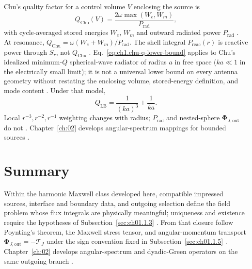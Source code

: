 Chu's quality factor for a control volume $V$ enclosing the source is
\begin{equation}
\label{eq:ch1.chu-q-definition}
Q_{\mathrm{Chu}}(V)=\frac{2\omega\max(W_e,W_m)}{P_{\mathrm{rad}}},
\end{equation}
with cycle-averaged stored energies $W_e$, $W_m$ and outward radiated power $P_{\mathrm{rad}}$ \cite{chu1948}. At resonance, $Q_{\mathrm{Chu}}=\omega(W_e+W_m)/P_{\mathrm{rad}}$. The shell integral $P_{\mathrm{reac}}(r)$ is reactive power through $S_r$, not $Q_{\mathrm{Chu}}$ \cite{chu1948,stratton1941}. Eq.~\eqref{eq:ch1.chu-q-lower-bound} applies to Chu's idealized minimum-$Q$ spherical-wave radiator of radius $a$ in free space ($ka\ll 1$ in the electrically small limit); it is not a universal lower bound on every antenna geometry without restating the enclosing volume, stored-energy definition, and mode content \cite{chu1948}. Under that model,
\begin{equation}
\label{eq:ch1.chu-q-lower-bound}
Q_{\mathrm{LB}}=\frac{1}{(ka)^3}+\frac{1}{ka}.
\end{equation}
Local $r^{-3},r^{-2},r^{-1}$ weighting changes with radius; $P_{\mathrm{rad}}$ and nested-sphere $\boldsymbol{\Phi}_{J,\mathrm{out}}$ do not \cite{poynting1884,stratton1941}. Chapter~\ref{ch:02} develops angular-spectrum mappings for bounded sources \cite{harrington2001}.

\section{Summary}
\label{sec:ch01.7}

Within the harmonic Maxwell class developed here, compatible impressed sources, interface and boundary data, and outgoing selection define the field problem whose flux integrals are physically meaningful; uniqueness and existence require the hypotheses of Subsection~\ref{sec:ch01.1.3} \cite{maxwell1873,stratton1941}. From that closure follow Poynting's theorem, the Maxwell stress tensor, and angular-momentum transport $\boldsymbol{\Phi}_{J,\mathrm{out}}=-\boldsymbol{\mathcal{T}}_J$ under the sign convention fixed in Subsection~\ref{sec:ch01.1.5} \cite{poynting1884,beth1936}. Chapter~\ref{ch:02} develops angular-spectrum and dyadic-Green operators on the same outgoing branch \cite{harrington2001,tai1994}.

\label{sec:ch01.7.1}
\label{eq:ch1.continuity-admissibility}%
\label{eq:ch1.continuity-charge-continuous}%
\label{eq:ch1.master-admissibility-chain}%
\label{eq:ch1.master-charge-continuous-chain}%
\label{eq:ch1.report-class-lock}%
\label{sec:ch01.7.2}
\label{sec:ch01.7.3}
\label{eq:ch1.bridge-compatibility-criteria}%
\label{eq:ch1.compatibility-criteria}%


